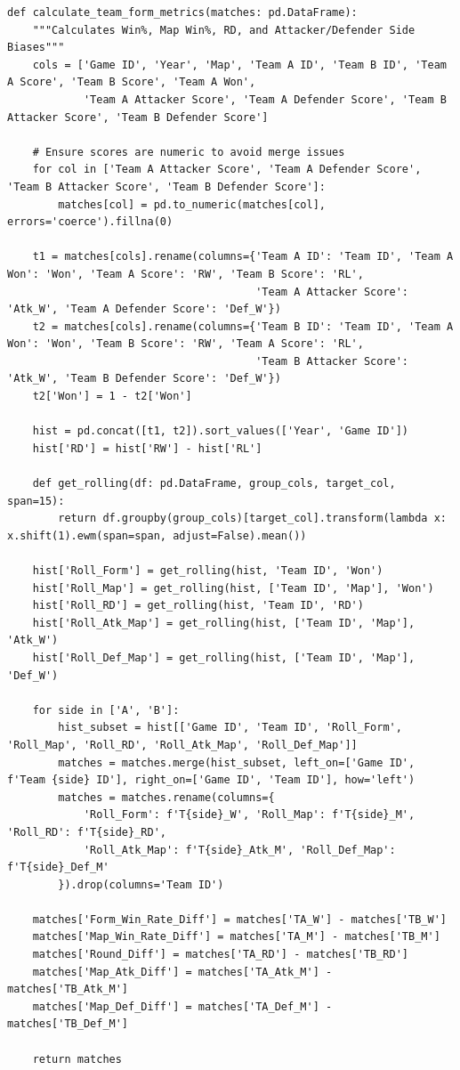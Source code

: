 \begin{lstlisting}[style=code,caption={Function for calculating team form metrics},label={lst:team_form_metrics}]
def calculate_team_form_metrics(matches: pd.DataFrame):
    """Calculates Win%, Map Win%, RD, and Attacker/Defender Side Biases"""
    cols = ['Game ID', 'Year', 'Map', 'Team A ID', 'Team B ID', 'Team A Score', 'Team B Score', 'Team A Won',
            'Team A Attacker Score', 'Team A Defender Score', 'Team B Attacker Score', 'Team B Defender Score']
    
    # Ensure scores are numeric to avoid merge issues
    for col in ['Team A Attacker Score', 'Team A Defender Score', 'Team B Attacker Score', 'Team B Defender Score']:
        matches[col] = pd.to_numeric(matches[col], errors='coerce').fillna(0)

    t1 = matches[cols].rename(columns={'Team A ID': 'Team ID', 'Team A Won': 'Won', 'Team A Score': 'RW', 'Team B Score': 'RL',
                                       'Team A Attacker Score': 'Atk_W', 'Team A Defender Score': 'Def_W'})
    t2 = matches[cols].rename(columns={'Team B ID': 'Team ID', 'Team A Won': 'Won', 'Team B Score': 'RW', 'Team A Score': 'RL',
                                       'Team B Attacker Score': 'Atk_W', 'Team B Defender Score': 'Def_W'})
    t2['Won'] = 1 - t2['Won']
    
    hist = pd.concat([t1, t2]).sort_values(['Year', 'Game ID'])
    hist['RD'] = hist['RW'] - hist['RL']
    
    def get_rolling(df: pd.DataFrame, group_cols, target_col, span=15):
        return df.groupby(group_cols)[target_col].transform(lambda x: x.shift(1).ewm(span=span, adjust=False).mean())

    hist['Roll_Form'] = get_rolling(hist, 'Team ID', 'Won')
    hist['Roll_Map'] = get_rolling(hist, ['Team ID', 'Map'], 'Won')
    hist['Roll_RD'] = get_rolling(hist, 'Team ID', 'RD')
    hist['Roll_Atk_Map'] = get_rolling(hist, ['Team ID', 'Map'], 'Atk_W')
    hist['Roll_Def_Map'] = get_rolling(hist, ['Team ID', 'Map'], 'Def_W')

    for side in ['A', 'B']:
        hist_subset = hist[['Game ID', 'Team ID', 'Roll_Form', 'Roll_Map', 'Roll_RD', 'Roll_Atk_Map', 'Roll_Def_Map']]
        matches = matches.merge(hist_subset, left_on=['Game ID', f'Team {side} ID'], right_on=['Game ID', 'Team ID'], how='left')
        matches = matches.rename(columns={
            'Roll_Form': f'T{side}_W', 'Roll_Map': f'T{side}_M', 'Roll_RD': f'T{side}_RD',
            'Roll_Atk_Map': f'T{side}_Atk_M', 'Roll_Def_Map': f'T{side}_Def_M'
        }).drop(columns='Team ID')

    matches['Form_Win_Rate_Diff'] = matches['TA_W'] - matches['TB_W']
    matches['Map_Win_Rate_Diff'] = matches['TA_M'] - matches['TB_M']
    matches['Round_Diff'] = matches['TA_RD'] - matches['TB_RD']
    matches['Map_Atk_Diff'] = matches['TA_Atk_M'] - matches['TB_Atk_M']
    matches['Map_Def_Diff'] = matches['TA_Def_M'] - matches['TB_Def_M']
    
    return matches
\end{lstlisting}

